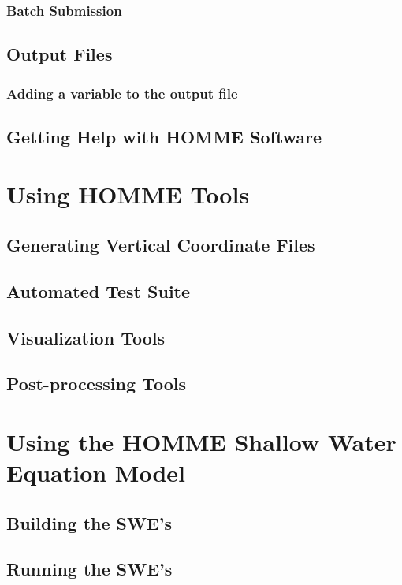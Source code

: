 \documentclass[12pt]{article}
\numberwithin{equation}{section}
\begin{document}
\subsubsection{Batch Submission}
\subsection{Output Files}
\subsubsection{Adding a variable to the output file}


\subsection{Getting Help with HOMME Software}			%

\section{Using HOMME Tools}
\subsection{Generating Vertical Coordinate Files \label{sec:vcoord}}
\subsection{Automated Test Suite \label{sec:TestSuite} }		

\subsection{Visualization Tools}						%
\subsection{Post-processing Tools}						%

\section{Using the HOMME Shallow Water Equation Model\label{sec:SWE}}
\subsection{Building the SWE's}
\subsection{Running the SWE's}
\end{document}
